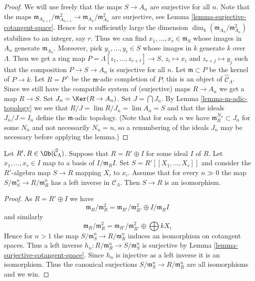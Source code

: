 \begin{proof}
We will use freely that the maps $S \to A_n$ are surjective for all $n$.
Note that the maps
$\mathfrak m_{A_{n + 1}}/\mathfrak m_{A_{n + 1}}^2 \to
\mathfrak m_{A_n}/\mathfrak m_{A_n}^2$ are surjective, see
Lemma \ref{lemma-surjective-cotangent-space}.
Hence for $n$ sufficiently large the dimension
$\dim_k (\mathfrak m_{A_n}/\mathfrak m_{A_n}^2)$ stabilizes to an
integer, say $r$.
Thus we can find $x_1, \ldots, x_r \in \mathfrak m_S$ whose images in
$A_n$ generate $\mathfrak m_{A_n}$. Moreover, pick $y_1, \ldots, y_t \in S$
whose images in $k$ generate $k$ over $\Lambda$. Then we get a ring map
$P = \Lambda[z_1, \ldots, z_{r + t}] \to S$, $z_i \mapsto x_i$ and
$z_{r + j} \mapsto y_j$ such that the composition
$P \to S \to A_n$ is surjective for all $n$. Let $\mathfrak m \subset P$
be the kernel of $P \to k$. Let $R = P^\wedge$ be the $\mathfrak m$-adic
completion of $P$; this is an object of $\widehat{\mathcal{C}}_\Lambda$.
Since we still have the compatible system of (surjective) maps $R \to A_n$
we get a map $R \to S$. Set $J_n = \Ker(R \to A_n)$.
Set $J = \bigcap J_n$. By
Lemma \ref{lemma-m-adic-topology}
we see that $R/J = \lim R/J_n = \lim A_n = S$
and that the ideals $J_n/J = I_n$ define the $\mathfrak m$-adic topology.
(Note that for each $n$ we have $\mathfrak m_R^{N_n} \subset J_n$ for
some $N_n$ and not necessarily $N_n = n$, so a renumbering of the ideals
$J_n$ may be necessary before applying the lemma.)
\end{proof}

\begin{lemma}
\label{lemma-power-series}
Let $R', R \in \Ob(\widehat{\mathcal{C}}_\Lambda)$. Suppose that
$R = R' \oplus I$ for some ideal $I$ of $R$. Let $x_1, \ldots, x_r \in I$
map to a basis of $I/\mathfrak m_R I$. Set $S = R'[[X_1, \ldots, X_r]]$
and consider the $R'$-algebra map $S \to R$ mapping $X_i$ to $x_i$.
Assume that for every $n \gg 0$ the map
$S/\mathfrak m_S^n \to R/\mathfrak m_R^n$ has a left inverse in
$\mathcal{C}_\Lambda$. Then $S \to R$ is an isomorphism.
\end{lemma}

\begin{proof}
As $R = R' \oplus I$ we have
$$
\mathfrak m_R/\mathfrak m_R^2 =
\mathfrak m_{R'}/\mathfrak m_{R'}^2 \oplus I/\mathfrak m_RI
$$
and similarly
$$
\mathfrak m_R/\mathfrak m_R^2 =
\mathfrak m_{R'}/\mathfrak m_{R'}^2 \oplus \bigoplus kX_i
$$
Hence for $n > 1$ the map $S/\mathfrak m_S^n \to R/\mathfrak m_R^n$
induces an isomorphism on cotangent spaces. Thus a left inverse
$h_n : R/\mathfrak m_R^n \to S/\mathfrak m_S^n$ is surjective by
Lemma \ref{lemma-surjective-cotangent-space}.
Since $h_n$ is injective as a left inverse it is an isomorphism.
Thus the canonical surjections $S/\mathfrak m_S^n \to R/\mathfrak m_R^n$
are all isomorphisms and we win.
\end{proof}




